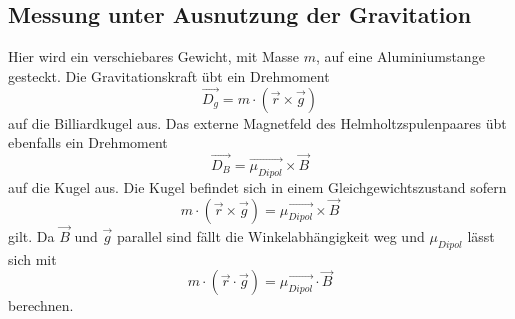 \subsection{Messung unter Ausnutzung der Gravitation}
Hier wird ein verschiebares Gewicht, mit Masse $m$, auf eine Aluminiumstange gesteckt.
Die Gravitationskraft übt ein Drehmoment
\begin{equation}
  \vec{D_g} = m \cdot(\vec{r} \times \vec{g})
\end{equation}
auf die Billiardkugel aus.
Das externe Magnetfeld des Helmholtzspulenpaares übt ebenfalls ein Drehmoment
\begin{equation}
  \vec{D_B} = \vec{\mu_{Dipol}} \times \vec{B}
\end{equation}
auf die Kugel aus.
Die Kugel befindet sich in einem Gleichgewichtszustand sofern
\begin{equation}
   m \cdot(\vec{r} \times \vec{g}) = \vec{\mu_{Dipol}} \times \vec{B}
\end{equation}
 gilt.
 Da $\vec{B}$ und $\vec{g}$ parallel sind fällt die Winkelabhängigkeit weg und $\mu_{Dipol}$ lässt sich mit
 \begin{equation}
    m \cdot(\vec{r} \cdot \vec{g}) = \vec{\mu_{Dipol}} \cdot \vec{B}
 \end{equation}
 berechnen.
